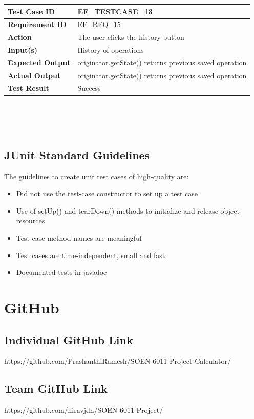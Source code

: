 \documentclass[11pt, english]{report}
\begin{document}
\setlength{\tabcolsep}{18pt}
\renewcommand{\arraystretch}{1.5}
\begin{tabular}{ |p{4cm}|p{8cm}| }
\hline
\textbf{Test Case ID} &  EF\_TESTCASE\_13 \\ \hline 
\textbf{Requirement ID} & EF\_REQ\_15\\ \hline
\textbf{Action} & The user clicks the history button\\ \hline
\textbf{Input(s)} & History of operations \\ \hline
\textbf{Expected Output} & originator.getState() returns previous saved operation \\ \hline
\textbf{Actual Output} & originator.getState() returns previous saved operation \\ \hline
\textbf{Test Result} & Success \\ 
\hline
\end{tabular} \\ \\ \\

\section{JUnit Standard Guidelines}

The guidelines to create unit test cases of high-quality are:

\begin{itemize}
    \item Did not use the test-case constructor to set up a test case
    \item Use of setUp() and tearDown() methods to initialize and release object resources
    \item Test case method names are meaningful
    \item Test cases are time-independent, small and fast
    \item Documented tests in javadoc
   
\end{itemize}

\appendix
\chapter{GitHub}
\section{Individual GitHub Link}
https://github.com/PrashanthiRamesh/SOEN-6011-Project-Calculator/

\section{Team GitHub Link}
https://github.com/niravjdn/SOEN-6011-Project/


\printbibliography

\printglossary
\end{document}
